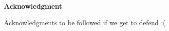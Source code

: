 \begin{center}
	\textbf{Acknowledgment}
\end{center}

Acknowledgments to be followed if we get to defend :(